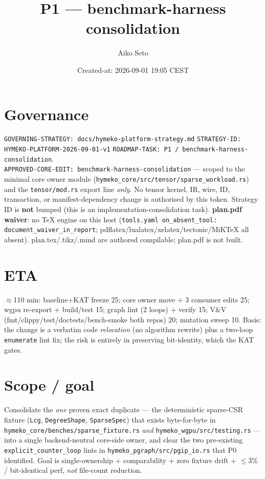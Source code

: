 \documentclass[11pt]{article}
\title{P1 --- benchmark-harness consolidation}\author{Aiko Seto}
\date{Created-at: 2026-09-01 19:05 CEST}
\begin{document}
\maketitle

\section*{Governance}
\texttt{GOVERNING-STRATEGY: docs/hymeko-platform-strategy.md} \textperiodcentered{}
\texttt{STRATEGY-ID: HYMEKO-PLATFORM-2026-09-01-v1} \textperiodcentered{}
\texttt{ROADMAP-TASK: P1 / benchmark-harness-consolidation}. \\
\texttt{APPROVED-CORE-EDIT: benchmark-harness-consolidation} --- scoped to the minimal core owner
module (\texttt{hymeko\_core/src/tensor/sparse\_workload.rs}) and the \texttt{tensor/mod.rs} export line
\emph{only}. No tensor kernel, IR, wire, ID, transaction, or manifest-dependency change is authorised by
this token. Strategy ID is \textbf{not} bumped (this is an implementation-consolidation task).
\textbf{plan.pdf waiver}: no TeX engine on this host (\texttt{tools.yaml on\_absent\_tool:
document\_waiver\_in\_report}; pdflatex/lualatex/xelatex/tectonic/MiKTeX all absent). plan.tex/.tikz/.mmd
are authored compilable; plan.pdf is not built.

\section*{ETA}
$\approx$110 min: baseline+KAT freeze 25; core owner move + 3 consumer edits 25; wgpu re-export + build/test
15; graph lint (2 loops) + verify 15; V\&V (fmt/clippy/test/doctests/bench-smoke both repos) 20; mutation
sweep 10. Basis: the change is a verbatim code \emph{relocation} (no algorithm rewrite) plus a two-loop
\texttt{enumerate} lint fix; the risk is entirely in preserving bit-identity, which the KAT gates.

\section*{Scope / goal}
Consolidate the \emph{one} proven exact duplicate --- the deterministic sparse-CSR fixture
(\texttt{Lcg}, \texttt{DegreeShape}, \texttt{SparseSpec}) that exists byte-for-byte in
\texttt{hymeko\_core/benches/sparse\_fixture.rs} \emph{and} \texttt{hymeko\_wgpu/src/testing.rs} --- into a
single backend-neutral core-side owner, and clear the two pre-existing \texttt{explicit\_counter\_loop}
lints in \texttt{hymeko\_pgraph/src/pgip\_io.rs} that P0 identified. Goal is single-ownership +
comparability + zero fixture drift + $\le 3\%$ / bit-identical perf, \emph{not} file-count reduction.
\end{document}
